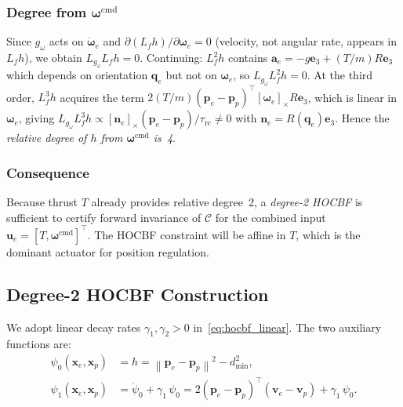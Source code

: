 \documentclass[lettersize,journal]{IEEEtran}
\theoremstyle{definition}
\theoremstyle{remark}
\newcommand{\norm}[1]{\left\| #1 \right\|}
\newcommand{\vect}[1]{\bm{#1}}
\begin{document}
\subsubsection*{Degree from $\vect{\omega}^{\mathrm{cmd}}$}
Since $g_\omega$ acts on $\dot{\vect{\omega}}_e$ and
$\partial(L_f h)/\partial\vect{\omega}_e = 0$ (velocity, not angular
rate, appears in $L_f h$), we obtain
$L_{g_\omega}L_f h = 0$.
Continuing: $L_f^2 h$ contains $\vect{a}_e = -g\vect{e}_3 + (T/m)R\vect{e}_3$
which depends on orientation $\vect{q}_e$ but not on $\vect{\omega}_e$,
so $L_{g_\omega}L_f^2 h = 0$.
At the third order, $L_f^3 h$ acquires the term
$2(T/m)(\vect{p}_e-\vect{p}_p)^\top[\vect{\omega}_e]_\times R\vect{e}_3$,
which is linear in $\vect{\omega}_e$, giving
$L_{g_\omega}L_f^3 h \propto [\vect{n}_e]_\times(\vect{p}_e-\vect{p}_p)/\tau_{\mathrm{rc}} \neq 0$
with $\vect{n}_e = R(\vect{q}_e)\vect{e}_3$.
Hence the \emph{relative degree of $h$ from $\vect{\omega}^{\mathrm{cmd}}$ is~4}.

\subsubsection*{Consequence}
Because thrust $T$ already provides relative degree~2, a
\emph{degree-2 HOCBF} is sufficient to certify forward invariance
of $\mathcal{C}$ for the combined input
$\vect{u}_e = [T, \vect{\omega}^{\mathrm{cmd}}]^\top$.
The HOCBF constraint will be affine in $T$, which is the dominant
actuator for position regulation.

\subsection{Degree-2 HOCBF Construction}
\label{sec:hocbf_construction}

We adopt linear decay rates $\gamma_1, \gamma_2 > 0$ in~\eqref{eq:hocbf_linear}.
The two auxiliary functions are:
\begin{align}
    \psi_0(\vect{x}_e,\vect{x}_p)
        &= h = \norm{\vect{p}_e - \vect{p}_p}^2 - d_{\min}^2,
        \label{eq:psi0} \\[4pt]
    \psi_1(\vect{x}_e,\vect{x}_p)
        &= \dot{\psi}_0 + \gamma_1\,\psi_0
         = 2(\vect{p}_e-\vect{p}_p)^\top(\vect{v}_e-\vect{v}_p)
         + \gamma_1\,\psi_0.
        \label{eq:psi1}
\end{align}
\end{document}
